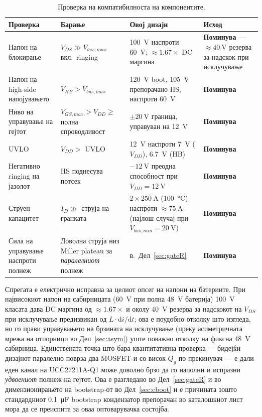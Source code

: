\documentclass[journal,onecolumn,11pt]{IEEEtran}
\begin{document}
\begin{table}[t]
\centering
\caption{Проверка на компатибилноста на компонентите.}
\label{tab:compat}
\small
\begin{tabularx}{\columnwidth}{@{}L L L >{\RaggedRight\arraybackslash}p{2.0cm}@{}}
\toprule
\textbf{Проверка} & \textbf{Барање} & \textbf{Овој дизајн} & \textbf{Исход} \\
\midrule
Напон на блокирање & $V_{DS}\gg V_{bus,max}$ вкл.\ ringing & \SI{100}{\volt}
наспроти \SI{60}{\volt}; $\approx 1.67\times$ DC маргина & \textbf{Поминува} ---
$\approx\SI{40}{\volt}$ резерва за надскок при исклучување~\cite{ipt015ds} \\
Напон на high-side напојувањето & $V_{HB}>V_{bus,max}$ & \SI{120}{\volt} boot,
\SI{105}{\volt} препорачано HS, наспроти \SI{60}{\volt} & \textbf{Поминува}~\cite{ucc27211} \\
Ниво на управување на гејтот & $V_{GS,max}>V_{DD}\ge$ полна спроводливост &
$\pm\SI{20}{\volt}$ граница, управуван на \SI{12}{\volt} & \textbf{Поминува}~\cite{ipt015ds,ucc27211} \\
UVLO & $V_{DD}>$ UVLO & \SI{12}{\volt} наспроти \SI{7}{\volt} ($V_{DD}$),
\SI{6.7}{\volt} (HB) & \textbf{Поминува}~\cite{ucc27211} \\
Негативно ringing на јазолот & HS поднесува потсек & $-\SI{12}{\volt}$ преодна
способност при $V_{DD}=\SI{12}{\volt}$ & \textbf{Поминува}~\cite{ucc27211} \\
Струен капацитет & $I_D\gg$ струја на гранката & $2\times\SI{250}{\ampere}$
(\SI{100}{\celsius}) наспроти $\approx\SI{75}{\ampere}$ (најлош случај при
$V_{bus,min}=\SI{20}{\volt}$) & \textbf{Поминува}~\cite{ipt015ds} \\
Сила на управување наспроти полнеж & Доволна струја низ Miller plateau за
\emph{паралелниот} полнеж & в.\ Дел~\ref{sec:gateR} & \textbf{Поминува} \\
\bottomrule
\end{tabularx}
\end{table}

Спрегата е електрично исправна за целиот опсег на напони на батериите. При
највисокиот напон на сабирницата (\SI{60}{\volt} при полна \SI{48}{\volt} батерија)
\SI{100}{\volt} класата дава DC маргина од $\approx 1.67\times$ и околу
\SI{40}{\volt} резерва за надскокот на $V_{DS}$ при исклучување предизвикан од
$L\cdot\mathrm{d}i/\mathrm{d}t$; ова е поудобно отколку што изгледа, но го прави
управувањето на брзината на исклучување (преку асиметричната мрежа на отпорници во
Дел~\ref{sec:asym}) уште поважно отколку на фиксна \SI{48}{\volt} сабирница.
Единствената точка што бара квантитативна проверка --- бидејќи дизајнот паралелно
поврза два MOSFET-и со висок $Q_g$ по прекинувач --- е дали еден канал на
UCC27211A-Q1 може доволно брзо да го наполни и испразни \emph{удвоениот} полнеж на
гејтот. Ова е разгледано во Дел~\ref{sec:gateR} и во димензионирањето на bootstrap-от
во Дел~\ref{sec:cboot} и е причината зошто стандардниот \SI{0.1}{\micro\farad}
bootstrap кондензатор препорачан во каталошкиот лист мора да се преиспита за оваа
оптоварувачка состојба.
\end{document}

